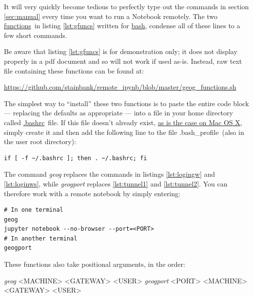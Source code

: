 \documentclass[a4paper]{article}
\begin{document}
It will very quickly become tedious to perfectly type out the commands in section \ref{sec:manual} every time you want to run a Notebook remotely.
The two \href{https://www.shellscript.sh/functions.html}{functions}~in listing
\ref{lst:gfuncs} written for \href{http://cs.lmu.edu/~ray/notes/bash/}{bash}, condense all of these lines to a few short commands.



Be aware that listing \ref{lst:gfuncs} is for demonstration only; it does not display properly in a pdf document and so will not work if used as-is.
Instead, raw text file containing these functions can be found at:

\noindent\small\url{https://github.com/stainbank/remote_ipynb/blob/master/geog_functions.sh}

The simplest way to ``install'' these two functions is to paste the entire code block --- replacing the defaults as appropriate --- into a file in your home directory called \href{http://superuser.com/questions/49289/what-is-the-bashrc-file}{.bashrc}~file.
If this file doesn't already exist, \href{http://apple.stackexchange.com/a/119714}{as is the case on Mac OS X}, simply create it and then add the following line to the file .bash\_profile~(also in the user root directory):

\begin{lstlisting}[caption={Source .bashrc on startup}, label={lst:srcbashrc}]
if [ -f ~/.bashrc ]; then . ~/.bashrc; fi
\end{lstlisting}

The command \emph{geog} replaces the commands in listings \ref{lst:logingw} and \ref{lst:loginws}, while \emph{geogport} replaces \ref{lst:tunnel1} and \ref{lst:tunnel2}.
You can therefore work with a remote notebook by simply entering:
\begin{lstlisting}[caption={Set up and tunnel to remote Notebook server}, label={lst:usegfuncs}]
# In one terminal
geog
jupyter notebook --no-browser --port=<PORT>
# In another terminal
geogport
\end{lstlisting}

These functions also take positional arguments, in the order:

\emph{geog} \textless{}MACHINE\textgreater{} \textless{}GATEWAY\textgreater{} \textless{}USER\textgreater{}
\emph{geogport} \textless{}PORT\textgreater{} \textless{}MACHINE\textgreater{} \textless{}GATEWAY\textgreater{} \textless{}USER\textgreater{}
\end{document}
